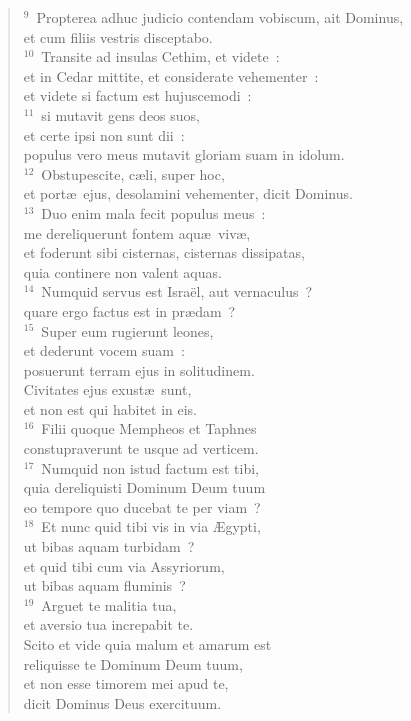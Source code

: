 \begin{flushleft}
\begin{verse}
${}^{9}$~Propterea adhuc judicio contendam vobiscum, ait Dominus,\\ et cum filiis vestris disceptabo.\\
${}^{10}$~Transite ad insulas Cethim, et videte~:\\ et in Cedar mittite, et considerate vehementer~:\\ et videte si factum est hujuscemodi~:\\
${}^{11}$~si mutavit gens deos suos,\\ et certe ipsi non sunt dii~:\\ populus vero meus mutavit gloriam suam in idolum.\\
${}^{12}$~Obstupescite, c\ae li, super hoc,\\ et port\ae\ ejus, desolamini vehementer, dicit Dominus.\\
${}^{13}$~Duo enim mala fecit populus meus~:\\ me dereliquerunt fontem aqu\ae\ viv\ae ,\\ et foderunt sibi cisternas, cisternas dissipatas,\\ quia continere non valent aquas.\\
${}^{14}$~Numquid servus est Isra\"el, aut vernaculus~?\\ quare ergo factus est in pr\ae dam~?\\
${}^{15}$~Super eum rugierunt leones,\\ et dederunt vocem suam~:\\ posuerunt terram ejus in solitudinem.\\ Civitates ejus exust\ae\ sunt,\\ et non est qui habitet in eis.\\
${}^{16}$~Filii quoque Mempheos et Taphnes\\ constupraverunt te usque ad verticem.\\
${}^{17}$~Numquid non istud factum est tibi,\\ quia dereliquisti Dominum Deum tuum\\ eo tempore quo ducebat te per viam~?\\
${}^{18}$~Et nunc quid tibi vis in via \AE gypti,\\ ut bibas aquam turbidam~?\\ et quid tibi cum via Assyriorum,\\ ut bibas aquam fluminis~?\\
${}^{19}$~Arguet te malitia tua,\\ et aversio tua increpabit te.\\ Scito et vide quia malum et amarum est\\ reliquisse te Dominum Deum tuum,\\ et non esse timorem mei apud te,\\ dicit Dominus Deus exercituum.\\

\end{verse}
\end{flushleft}
